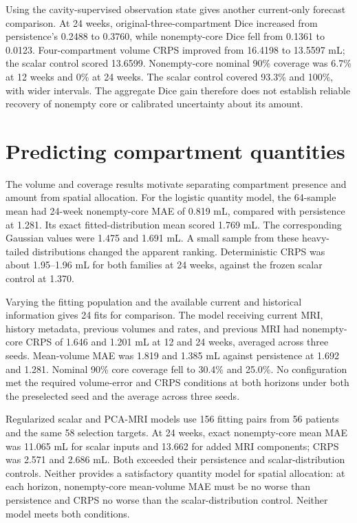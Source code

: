 Using the cavity-supervised observation state gives another current-only forecast comparison. At 24 weeks, original-three-compartment Dice increased from persistence's 0.2488 to 0.3760, while nonempty-core Dice fell from 0.1361 to 0.0123. Four-compartment volume CRPS improved from 16.4198 to 13.5597 mL; the scalar control scored 13.6599. Nonempty-core nominal 90\% coverage was 6.7\% at 12 weeks and 0\% at 24 weeks. The scalar control covered 93.3\% and 100\%, with wider intervals. The aggregate Dice gain therefore does not establish reliable recovery of nonempty core or calibrated uncertainty about its amount.

\section{Predicting compartment quantities}

The volume and coverage results motivate separating compartment presence and amount from spatial allocation. For the logistic quantity model, the 64-sample mean had 24-week nonempty-core MAE of 0.819 mL, compared with persistence at 1.281. Its exact fitted-distribution mean scored 1.769 mL. The corresponding Gaussian values were 1.475 and 1.691 mL. A small sample from these heavy-tailed distributions changed the apparent ranking. Deterministic CRPS was about 1.95--1.96 mL for both families at 24 weeks, against the frozen scalar control at 1.370.

Varying the fitting population and the available current and historical information gives 24 fits for comparison. The model receiving current MRI, history metadata, previous volumes and rates, and previous MRI had nonempty-core CRPS of 1.646 and 1.201 mL at 12 and 24 weeks, averaged across three seeds. Mean-volume MAE was 1.819 and 1.385 mL against persistence at 1.692 and 1.281. Nominal 90\% core coverage fell to 30.4\% and 25.0\%. No configuration met the required volume-error and CRPS conditions at both horizons under both the preselected seed and the average across three seeds.

Regularized scalar and PCA-MRI models use 156 fitting pairs from 56 patients and the same 58 selection targets. At 24 weeks, exact nonempty-core mean MAE was 11.065 mL for scalar inputs and 13.662 for added MRI components; CRPS was 2.571 and 2.686 mL. Both exceeded their persistence and scalar-distribution controls. Neither provides a satisfactory quantity model for spatial allocation: at each horizon, nonempty-core mean-volume MAE must be no worse than persistence and CRPS no worse than the scalar-distribution control. Neither model meets both conditions.

